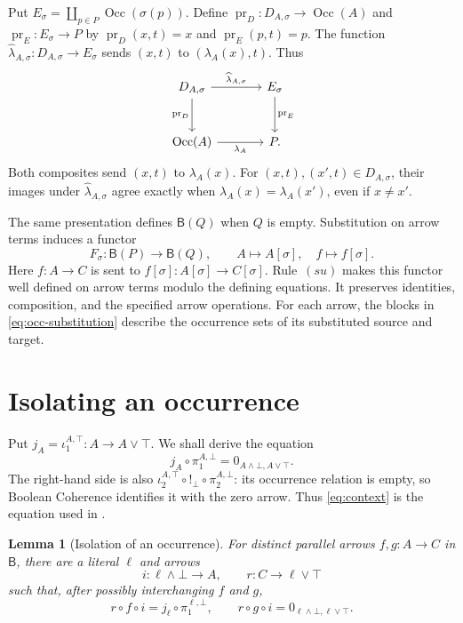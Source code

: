 \documentclass[11pt]{article}
\newtheorem{lemma}[theorem]{Lemma}
\newcommand{\B}{\mathsf B}
\newcommand{\Occ}{\operatorname{Occ}}
\begin{document}
Put $E_\sigma=\coprod_{p\in P}\Occ(\sigma(p))$.
Define $\operatorname{pr}_D:D_{A,\sigma}\to\Occ(A)$ and
$\operatorname{pr}_E:E_\sigma\to P$ by
$\operatorname{pr}_D(x,t)=x$ and $\operatorname{pr}_E(p,t)=p$.
The function
$\widehat\lambda_{A,\sigma}:D_{A,\sigma}\to E_\sigma$ sends
$(x,t)$ to $(\lambda_A(x),t)$. Thus
\begin{equation}
\begin{tikzcd}[column sep=large,row sep=large]
 D_{A,\sigma}\arrow[r,"\widehat\lambda_{A,\sigma}"]
   \arrow[d,"\operatorname{pr}_D"']
   &E_\sigma\arrow[d,"\operatorname{pr}_E"]\\
 \Occ(A)\arrow[r,"\lambda_A"']&P.
\end{tikzcd}
\label{eq:block-square}
\end{equation}
Both composites send $(x,t)$ to $\lambda_A(x)$.
For $(x,t),(x',t)\in D_{A,\sigma}$, their images under
$\widehat\lambda_{A,\sigma}$ agree exactly when
$\lambda_A(x)=\lambda_A(x')$, even if $x\ne x'$.

The same presentation defines $\B(Q)$ when $Q$ is empty.
Substitution on arrow terms induces a functor
\[
 F_\sigma:\B(P)\longrightarrow\B(Q),\qquad
 A\longmapsto A[\sigma],\quad f\longmapsto f[\sigma].
\]
Here $f:A\to C$ is sent to
$f[\sigma]:A[\sigma]\to C[\sigma]$.
Rule~$(su)$ makes this functor well defined on arrow terms modulo the
defining equations. It preserves identities, composition, and the
specified arrow operations. For each arrow, the blocks in
\eqref{eq:occ-substitution} describe the occurrence sets of its
substituted source and target.

\section{Isolating an occurrence}\label{sec:isolation}

Put $j_A=\iota_1^{A,\top}:A\to A\vee\top$. We shall derive the equation
\begin{equation}
 j_A\circ\pi_1^{A,\bot}
   =0_{A\wedge\bot,A\vee\top}.
 \tag{$K_A$}\label{eq:context}
\end{equation}
The right-hand side is also
$\iota_2^{A,\top}\circ!_\bot\circ\pi_2^{A,\bot}$: its occurrence
relation is empty, so Boolean Coherence identifies it with the zero
arrow. Thus \eqref{eq:context} is the equation used in
\cite[\S9.7, pp.~215--216]{DP}.

\begin{lemma}[Isolation of an occurrence]\label{lem:isolation}
For distinct parallel arrows $f,g:A\to C$ in $\B$, there are a
literal $\ell$ and arrows
\[
 i:\ell\wedge\bot\longrightarrow A,
 \qquad r:C\longrightarrow\ell\vee\top
\]
such that, after possibly interchanging $f$ and $g$,
\[
 r\circ f\circ i=j_\ell\circ\pi_1^{\ell,\bot},
 \qquad
 r\circ g\circ i=0_{\ell\wedge\bot,\ell\vee\top}.
\]
\end{lemma}
\end{document}
